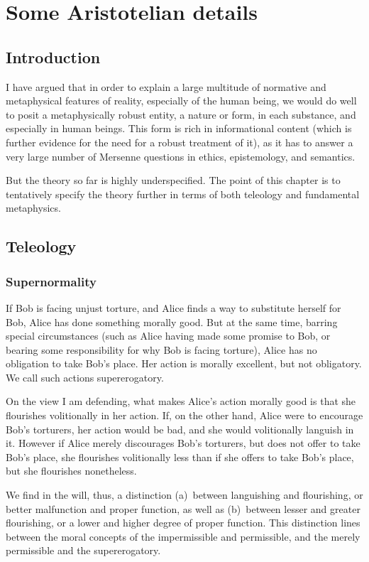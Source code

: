 \def\mychapter{X}

\chapter{Some Aristotelian details}\label{ch:details}
\section{Introduction}
I have argued that in order to explain a large multitude of normative and metaphysical features 
of reality, especially of the human being, we would do well to posit a metaphysically robust 
entity, a nature or form, in each substance, and especially in human beings. This form is rich 
in informational content (which is further evidence for the need for a robust treatment of it), 
as it has to answer a very large number of Mersenne questions in ethics, epistemology, and semantics. 

But the theory so far is highly underspecified. The point of this chapter is to tentatively specify 
the theory further in terms of both teleology and fundamental metaphysics. 

\section{Teleology}
\subsection{Supernormality}
If Bob is facing unjust torture, and Alice finds a way to substitute herself for Bob, 
Alice has done something morally good. But at the same time, barring special circumstances
(such as Alice having made some promise to Bob, or bearing some responsibility for why
Bob is facing torture), Alice has no obligation to take Bob's place. Her action is morally
excellent, but not obligatory. We call such actions supererogatory.

On the view I am defending, what makes Alice's action morally good is that she 
flourishes volitionally in her action. If, on the other hand, Alice were to encourage Bob's 
torturers, her action would be bad, and she would volitionally languish in it. However if Alice
merely discourages Bob's torturers, but does not offer to take Bob's place, she flourishes
volitionally less than if she offers to take Bob's place, but she flourishes nonetheless.

We find in the will, thus, a distinction (a)~between languishing and flourishing, or 
better malfunction and proper function, as well as (b)~between lesser and greater flourishing,
or a lower and higher degree of proper function. This distinction lines between the moral concepts of
the impermissible and permissible, and the merely permissible and the supererogatory. 

